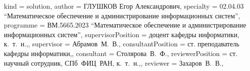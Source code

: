 {    kind               = {solution},
    author             = {ГЛУШКОВ Егор Александрович},
    specialty          = {02.04.03 \enquote{Математическое обеспечение и администрирование информационных систем}},
    programme          = {ВМ.5665.2023 \enquote{Математическое обеспечение и администрирование информационных систем}},
    supervisorPosition = {доцент кафедры информатики, к.~т.~н.,},
    supervisor         = {Абрамов~М.~В.},
    consultantPosition = {ст. преподаватель кафедры информатики,},
    consultant         = {Столярова~В.~Ф.},
    reviewerPosition   = {ст. научный сотрудник, СПб~ФИЦ~РАН, к.~т.~н.,},
    reviewer           = {Захаров~В.~В.},
}

